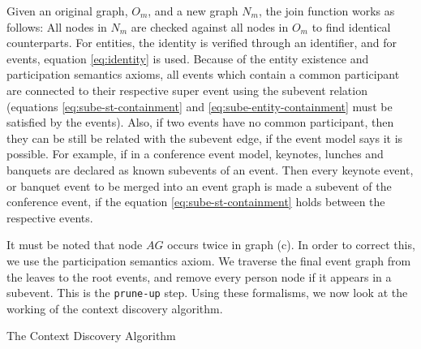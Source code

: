 Given an original graph, $O_m$, and a new graph $N_m$, the join function works as follows: All nodes in $N_m$ are checked against all nodes in $O_m$ to find identical counterparts. For entities, the identity is verified through an identifier, and for events, equation \eqref{eq:identity} is used. Because of the entity existence and participation semantics axioms, all events which contain a common participant are connected to their respective super event using the subevent relation (equations \eqref{eq:sube-st-containment} and \eqref{eq:sube-entity-containment} must be satisfied by the events). Also, if two events have no common participant, then they can be still be related with the subevent edge, if the event model says it is possible. For example, if in a conference event model, keynotes, lunches and banquets are declared as known subevents of an event. Then every keynote event, or banquet event to be merged into an event graph is made a subevent of the conference event, if the equation \eqref{eq:sube-st-containment} holds between the respective events. 

It must be noted that node $AG$ occurs twice in graph (c). In order to correct this, we use the participation semantics axiom. We traverse the final event graph from the leaves to the root events, and remove every person node if it appears in a subevent. This is the \texttt{prune-up} step. Using these formalisms, we now look at the working of the context discovery algorithm. 

\SetAlgoSkip{}
\begin{algorithm}[h]
\dontprintsemicolon 
{}
\caption{The Context Discovery Algorithm}
\label{alg:cx-alg}
\end{algorithm}

